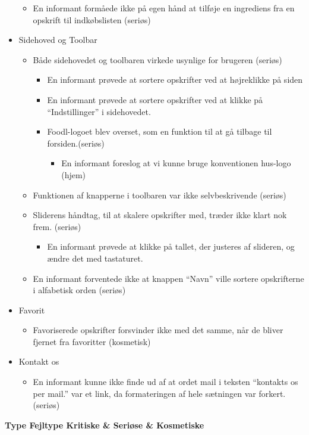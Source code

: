 \begin{itemize}[noitemsep]
   \begin{itemize}[noitemsep]
  \item En informant formåede ikke på egen hånd at tilføje en ingrediens fra en opskrift til indkøbslisten (seriøs)
  \end{itemize}
 \item Sidehoved og Toolbar
  \begin{itemize}[noitemsep]
  \item Både sidehovedet og toolbaren virkede usynlige for brugeren (seriøs)
   \begin{itemize}[noitemsep]
   \item En informant prøvede at sortere opskrifter ved at højreklikke på siden
   \item En informant prøvede at sortere opskrifter ved at klikke på ``Indstillinger'' i sidehovedet.
   \end{itemize}
   \begin{itemize}[noitemsep]
  \item Foodl-logoet blev overset, som en funktion til at gå tilbage til forsiden.(seriøs)
   \begin{itemize}[noitemsep]
   \item En informant foreslog at vi kunne bruge konventionen hus-logo (hjem)
   \end{itemize}
  \end{itemize}
  \item Funktionen af knapperne i toolbaren var ikke selvbeskrivende (seriøs)
  \item Sliderens håndtag, til at skalere opskrifter med, træder ikke klart nok frem. (seriøs)
   \begin{itemize}[noitemsep]
   \item En informant prøvede at klikke på tallet, der justeres af slideren, og ændre det med tastaturet.
   \end{itemize}
  \item En informant forventede ikke at knappen ``Navn'' ville sortere opskrifterne i alfabetisk orden (seriøs)
  \end{itemize}
 \item Favorit
  \begin{itemize}[noitemsep]
  \item Favoriserede opskrifter forsvinder ikke med det samme, når de bliver fjernet fra favoritter (kosmetisk)
  \end{itemize}
 \item Kontakt os
  \begin{itemize}[noitemsep]
  \item En informant kunne ikke finde ud af at ordet mail i teksten ``kontakts os per mail.'' var et link, da formateringen af hele sætningen var forkert. (seriøs)
  \end{itemize}
\end{itemize}


\textbf{
           						 {Type}
       {Fejltype             	}{Kritiske   & Seriøse   & Kosmetiske}{
}
}